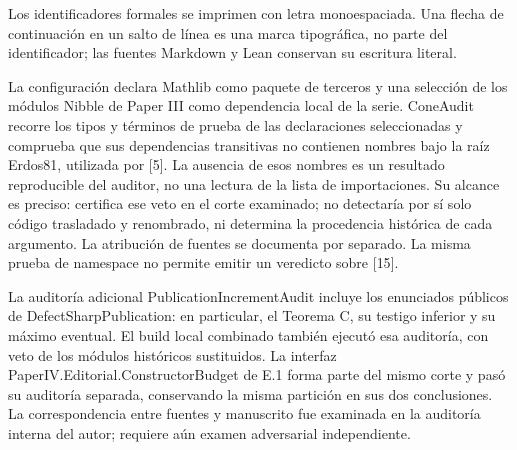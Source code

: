\documentclass[spanish,11pt,a4paper]{article}
\begin{document}
Los identificadores formales se imprimen con letra monoespaciada. Una flecha de continuación en un salto de línea es una marca tipográfica, no parte del identificador; las fuentes Markdown y Lean conservan su escritura literal.

La configuración declara Mathlib como paquete de terceros y una selección de los módulos {\ttfamily\small Nibble} de Paper III como dependencia local de la serie. {\ttfamily\small ConeAudit} recorre los tipos y términos de prueba de las declaraciones seleccionadas y comprueba que sus dependencias transitivas no contienen nombres bajo la raíz {\ttfamily\small Erdos81}, utilizada por {[}5{]}. La ausencia de esos nombres es un resultado reproducible del auditor, no una lectura de la lista de importaciones. Su alcance es preciso: certifica ese veto en el corte examinado; no detectaría por sí solo código trasladado y renombrado, ni determina la procedencia histórica de cada argumento. La atribución de fuentes se documenta por separado. La misma prueba de namespace no permite emitir un veredicto sobre {[}15{]}.

La auditoría adicional {\ttfamily\small PublicationI\discretionary{\hbox{\ensuremath{\hookrightarrow}}}{}{}ncrementAudi\discretionary{\hbox{\ensuremath{\hookrightarrow}}}{}{}t} incluye los enunciados públicos de {\ttfamily\small DefectSharpP\discretionary{\hbox{\ensuremath{\hookrightarrow}}}{}{}ublication}: en particular, el Teorema C, su testigo inferior y su máximo eventual. El build local combinado también ejecutó esa auditoría, con veto de los módulos históricos sustituidos. La interfaz {\ttfamily\small PaperIV.\discretionary{\hbox{\ensuremath{\hookrightarrow}}}{}{}Editorial.\discretionary{\hbox{\ensuremath{\hookrightarrow}}}{}{}ConstructorB\discretionary{\hbox{\ensuremath{\hookrightarrow}}}{}{}udget} de E.1 forma parte del mismo corte y pasó su auditoría separada, conservando la misma partición en sus dos conclusiones. La correspondencia entre fuentes y manuscrito fue examinada en la auditoría interna del autor; requiere aún examen adversarial independiente.
\end{document}
